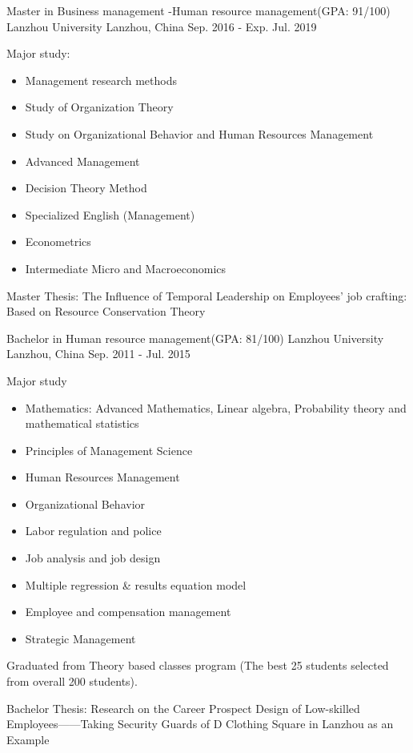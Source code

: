 \begin{cventries}
  \cventry
    {Master in Business management -Human resource management(GPA: 91/100)}
    {Lanzhou University}
    {Lanzhou, China}
    {Sep. 2016 - Exp. Jul. 2019}
    {
      \begin{cvitems}
        \item {
            Major study:
            \begin{itemize}
                \item Management research methods
		\item Study of Organization Theory
		\item Study on Organizational Behavior and Human Resources Management
                \item Advanced Management
		\item Decision Theory Method
		\item Specialized English (Management)
		\item Econometrics
		\item Intermediate Micro and Macroeconomics
	    \end{itemize}
        }
        \item {Master Thesis: The Influence of Temporal Leadership on Employees' job crafting: Based on Resource Conservation Theory}
      \end{cvitems}
    }
    \cventry
    {Bachelor in Human resource management(GPA: 81/100)}
    {Lanzhou University}
    {Lanzhou, China}
    {Sep. 2011 - Jul. 2015}
    {
      \begin{cvitems}
        \item {
            Major study
            \begin{itemize}
		\item Mathematics: Advanced Mathematics, Linear algebra, Probability theory and mathematical statistics 
		\item Principles of Management Science
                \item Human Resources Management
                \item Organizational Behavior
		\item Labor regulation and police
		\item Job analysis and job design
		\item Multiple regression \& results equation model
		\item Employee and compensation management
                \item Strategic Management            
	    \end{itemize}
        }
        \item {Graduated from Theory based classes program (The best 25 students selected from overall 200 students).}
        \item {Bachelor Thesis: Research on the Career Prospect Design of Low-skilled Employees——Taking Security Guards of D Clothing  Square in Lanzhou as an Example}
      \end{cvitems}
    }
\end{cventries}
